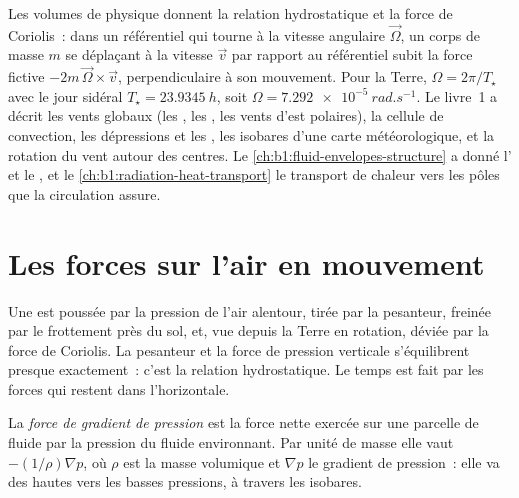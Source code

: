 \begin{recall}
Les volumes de physique donnent la relation hydrostatique et la force de Coriolis~: dans un
référentiel qui tourne à la vitesse angulaire $\vec\Omega$, un corps de masse $m$ se déplaçant
à la vitesse $\vec v$ par rapport au référentiel subit la force fictive
$-2m\,\vec\Omega\times\vec v$, perpendiculaire à son mouvement. Pour la Terre,
$\Omega = 2\pi/T_\star$ avec le jour sidéral $T_\star = \qty{23.9345}{h}$, soit
$\Omega = \qty{7.292e-5}{rad.s^{-1}}$. Le livre~1 a décrit les vents globaux (les ,
les , les vents d'est polaires), la cellule de convection, les dépressions et
les , les isobares d'une carte météorologique, et la rotation du vent autour des
centres. Le \cref{ch:b1:fluid-envelopes-structure} a donné l' et le
, et le \cref{ch:b1:radiation-heat-transport} le transport de chaleur
vers les pôles que la circulation assure.
\end{recall}

\section{Les forces sur l'air en mouvement}\label{sec:b1:atmospheric-circulation:forces}

Une  est poussée par la pression de l'air alentour, tirée par la pesanteur,
freinée par le frottement près du sol, et, vue depuis la Terre en rotation, déviée
par la force de Coriolis. La pesanteur et la force de pression verticale s'équilibrent
presque exactement~: c'est la relation hydrostatique. Le temps est fait par les forces
qui restent dans l'horizontale.

\begin{definition}\label{def:b1:atmospheric-circulation:pgf}
La \emph{force de gradient de pression} est la force nette
exercée sur une parcelle de fluide par la pression du fluide environnant. Par unité de masse elle
vaut $-(1/\rho)\nabla p$, où $\rho$ est la masse volumique et $\nabla p$ le gradient de
pression~: elle va des hautes vers les basses pressions, à travers les isobares.
\end{definition}

